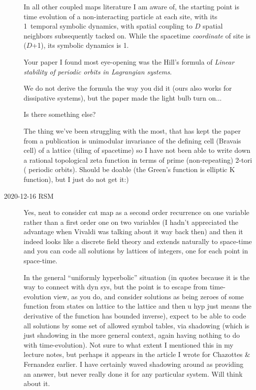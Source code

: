 \begin{description}
In all other coupled maps literature I am aware of, the starting point is
time evolution of a non-interacting particle at each site, with its
1\dmn\ temporal symbolic dynamics, with spatial coupling to $D$ spatial
neighbors subsequently tacked on. While the spacetime \emph{coordinate}
of site is ($D$+1)\dmn, its symbolic dynamics is 1\dmn.

Your paper I found most eye-opening was the Hill's formula of
{\em Linear stability of periodic orbits in {Lagrangian} systems}.

We do not derive the formula the way you did it (ours also works for
dissipative systems), but the paper made the light bulb turn on...

Is there something else?

The thing we've been struggling with the most, that has kept the paper from a
publication is unimodular invariance of the defining cell (Bravais cell)
of a lattice (tiling of spacetime) so I have not been able to write down
a rational {\spt} topological zeta function in terms of prime
(non-repeating) 2-tori ({\spt} periodic orbits). Should be doable (the
Green's function is elliptic K function), but I just do not get it:)

\item[2020-12-16 RSM]
Yes, neat to consider cat map as a second order recurrence on one
variable rather than a first order one on two variables (I hadn't
appreciated the advantage when Vivaldi was talking about it way back
then) and then it indeed looks like a discrete field theory and extends
naturally to space-time and you can code all solutions by lattices of
integers, one for each point in space-time.

In the general ``uniformly hyperbolic'' situation (in quotes because it
is the way to connect with dyn sys, but the point is to escape from
time-evolution view, as you do, and consider solutions as being zeroes of
some function from states on {\spt} lattice to the {\spt} lattice and
then u hyp just means the derivative of the function has bounded
inverse), expect to be able to code all solutions by some set of allowed
symbol tables, via {\spt} shadowing (which is just shadowing in the more
general context, again having nothing to do with time-evolution).  Not
sure to what extent I mentioned this in my lecture notes, but perhaps it
appears in the article I wrote for Chazottes \& Fernandez earlier.  I have
certainly waved {\spt} shadowing around as providing an answer, but never
really done it for any particular system.  Will think about it.


\end{description}
